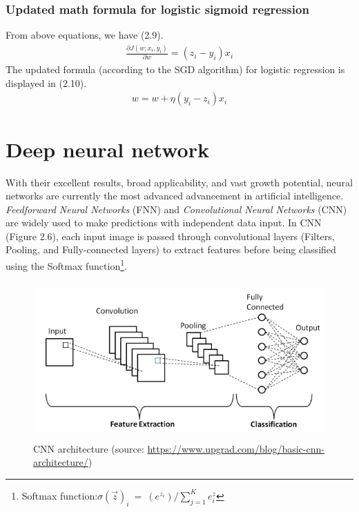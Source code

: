 \subsubsection{Updated math formula for logistic sigmoid regression}
\hspace{0.5cm}From above equations, we have (2.9).
\begin{align}
    \frac{\partial J(w; x_i, y_i)}{\partial w} = (z_i - y_i)x_i 
\end{align}
\hspace{0.5cm}The updated formula (according to the SGD algorithm) for logistic regression is displayed in (2.10).
\begin{align}
    w = w + \eta(y_i - z_i)x_i
\end{align}


\section{Deep neural network}
\label{sec:deep_neural_network}
\hspace{0.5cm}With their excellent results, broad applicability, and vast growth potential, neural networks are currently the most advanced advancement in artificial intelligence. \textit{Feedforward Neural Networks }(FNN) and \textit{Convolutional Neural Networks} (CNN) are widely used to make predictions with independent data input. In CNN (Figure 2.6), each input image is passed through convolutional layers (Filters, Pooling, and Fully-connected layers) to extract features before being classified using the Softmax function\footnote{Softmax function:$ \sigma (\overrightarrow{z})_i \: = \: (e^{z_i})/ \sum_{j=1}^{K} e^z_i  $}.
\begin{figure}[ht] 
	\centering
	\includegraphics[width=\linewidth, height=6cm,keepaspectratio]{figures/CNN.png}
	\caption{CNN architecture (source: \url{https://www.upgrad.com/blog/basic-cnn-architecture/})}
\end{figure}	

